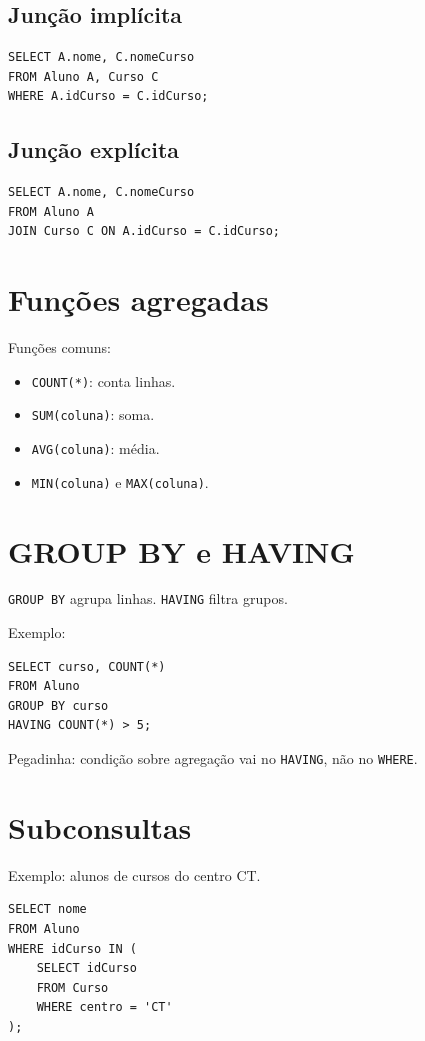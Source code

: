 \documentclass[12pt,a4paper]{article}
\begin{document}
\subsection{Junção implícita}
\begin{verbatim}
SELECT A.nome, C.nomeCurso
FROM Aluno A, Curso C
WHERE A.idCurso = C.idCurso;
\end{verbatim}

\subsection{Junção explícita}
\begin{verbatim}
SELECT A.nome, C.nomeCurso
FROM Aluno A
JOIN Curso C ON A.idCurso = C.idCurso;
\end{verbatim}

\section{Funções agregadas}
Funções comuns:
\begin{itemize}
    \item \texttt{COUNT(*)}: conta linhas.
    \item \texttt{SUM(coluna)}: soma.
    \item \texttt{AVG(coluna)}: média.
    \item \texttt{MIN(coluna)} e \texttt{MAX(coluna)}.
\end{itemize}

\section{GROUP BY e HAVING}
\texttt{GROUP BY} agrupa linhas. \texttt{HAVING} filtra grupos.

Exemplo:
\begin{verbatim}
SELECT curso, COUNT(*)
FROM Aluno
GROUP BY curso
HAVING COUNT(*) > 5;
\end{verbatim}

Pegadinha: condição sobre agregação vai no \texttt{HAVING}, não no \texttt{WHERE}.

\section{Subconsultas}
Exemplo: alunos de cursos do centro CT.
\begin{verbatim}
SELECT nome
FROM Aluno
WHERE idCurso IN (
    SELECT idCurso
    FROM Curso
    WHERE centro = 'CT'
);
\end{verbatim}
\end{document}
